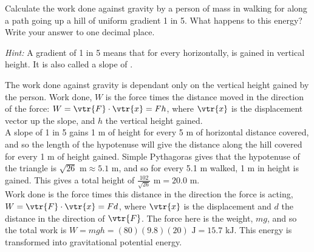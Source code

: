 
\begin{problem}[O1980PIQ2a]%
{Calculate the work done against gravity by a person of mass  in walking for  along a path going up a hill of uniform gradient 1 in 5. What happens to this energy? Write your answer to one decimal place.

\emph{Hint:} A gradient of 1 in 5 means that for every  horizontally,  is gained in vertical height. It is also called a slope of .}
{}
{The work done against gravity is dependant only on the vertical height gained by the person. Work done, $W$ is the force times the distance moved in the direction of the force: $W = \vtr{F}\cdot\vtr{x} = Fh$, where $\vtr{x}$ is the displacement vector up the slope, and $h$ the vertical height gained. \\

A slope of 1 in 5 gains 1 m of height for every 5 m of horizontal distance covered, and so the length of the hypotenuse will give the distance along the hill covered for every 1 m of height gained. Simple Pythagoras gives that the hypotenuse of the triangle is $\sqrt{26} \textrm{ m} \approx 5.1 \textrm{ m}$, and so for every 5.1 m walked, 1 m in height is gained. This gives a total height of $\frac{102}{\sqrt{26}} \textrm{ m} = 20.0 \textrm{ m}$.\\

Work done is the force times this distance in the direction the force is acting, $W = \vtr{F}\cdot\vtr{x} = Fd$, where $\vtr{x}$ is the displacement and $d$ the distance in the direction of $\vtr{F}$. The force here is the weight, $mg$, and so the total work is $W = mgh = (80)(9.8)(20) \textrm{ J} = 15.7 \textrm{ kJ}$. This energy is transformed into gravitational potential energy.
}
\end{problem}